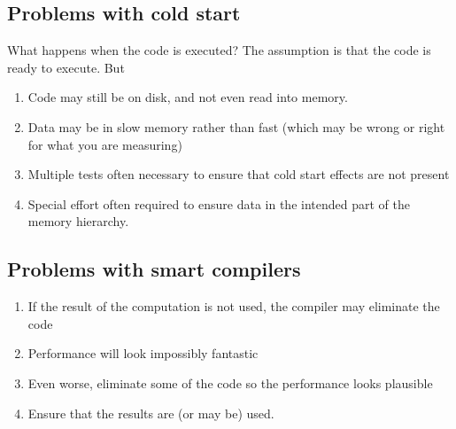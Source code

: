 \documentclass[%
oneside,                 %
final,                   %
10pt]{article}
\begin{document}
\noindent
\subsection{Problems with cold start}

What happens when the code is executed? The assumption is that the code is ready to
execute. But
\begin{enumerate}
\item Code may still be on disk, and not even read into memory.

\item Data may be in slow memory rather than fast (which may be wrong or right for what you are measuring)

\item Multiple tests often necessary to ensure that cold start effects are not present

\item Special effort often required to ensure data in the intended part of the memory hierarchy.
\end{enumerate}

\noindent
\subsection{Problems with smart compilers}

\begin{enumerate}
\item If the result of the computation is not used, the compiler may eliminate the code

\item Performance will look impossibly fantastic

\item Even worse, eliminate some of the code so the performance looks plausible

\item Ensure that the results are (or may be) used.
\end{enumerate}

\noindent
\end{document}
